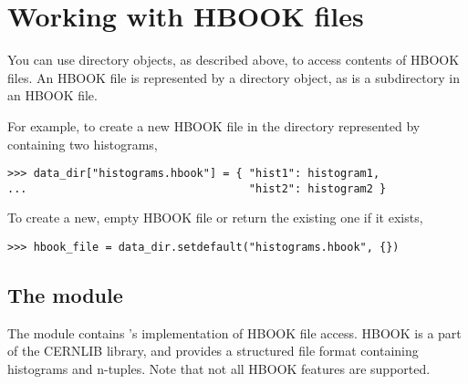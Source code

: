 
\section{Working with HBOOK files}

You can use directory objects, as described above, to access contents of
HBOOK files.  An HBOOK file is represented by a directory object, as is
a subdirectory in an HBOOK file.

For example, to create a new HBOOK file in the directory represented by
 containing two histograms,
\begin{verbatim}
>>> data_dir["histograms.hbook"] = { "hist1": histogram1,
...                                  "hist2": histogram2 }
\end{verbatim}
To create a new, empty HBOOK file or return the existing one if it
exists,
\begin{verbatim}
>>> hbook_file = data_dir.setdefault("histograms.hbook", {})
\end{verbatim}

\subsection{The  module}

The  module contains \pyhep's implementation
of HBOOK file access.  HBOOK is a part of the CERNLIB library, and
provides a structured file format containing histograms and n-tuples.
Note that not all HBOOK features are supported.

